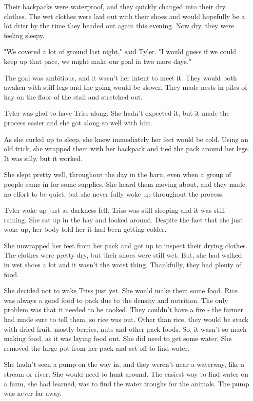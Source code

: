 \documentclass[courier]{sffms}
\begin{document}
Their backpacks were waterproof, and they quickly
changed into their dry clothes. The wet clothes were
laid out with their shoes and would hopefully be a lot
drier by the time they headed out again this evening.
Now dry, they were feeling sleepy.

"We covered a lot of ground last night," said Tyler. "I
would guess if we could keep up that pace, we might
make our goal in two more days."

The goal was ambitious, and it wasn't her intent to meet
it. They would both awaken with stiff legs and the going
would be slower. They made nests in piles of hay on
the floor of the stall and stretched out.

Tyler was glad to have Triss along. She hadn't expected
it, but it made the process easier and she got along
so well with him.

As she curled up to sleep, she knew immediately her feet
would be cold. Using an old trick, she wrapped them with
her backpack and tied the pack around her legs. It was
silly, but it worked.

She slept pretty well, throughout the day in the barn, even
when a group of people came in for some supplies. She
heard them moving about, and they made no effort to be
quiet, but she never fully woke up throughout the process.

Tyler woke up just as darkness fell. Triss was still sleeping
and it was still raining. She sat up in the hay and looked
around. Despite the fact that she just woke up, her
body told her it had been getting colder.

She unwrapped her feet from her pack and got up to
inspect their drying clothes. The clothes were pretty
dry, but their shoes were still wet. But, she had walked
in wet shoes a lot and it wasn't the worst thing.
Thankfully, they had plenty of food.

She decided not to wake Triss just yet. She would make
them some food. Rice was always a good food to pack
due to the density and nutrition. The only problem was
that it needed to be cooked. They couldn't have a fire -
the farmer had made sure to tell them, so rice was out.
Other than rice, they would be stuck with dried fruit, mostly
berries, nuts and other pack foods. So, it wasn't so much
making food, as it was laying food out. She did need to
get some water. She removed the large pot from her pack
and set off to find water.

She hadn't seen a pump on the way in, and they weren't
near a waterway, like a stream or river. She would need
to hunt around. The easiest way to find water on a farm,
she had learned, was to find the water troughs for the
animals. The pump was never far away.
\end{document}
